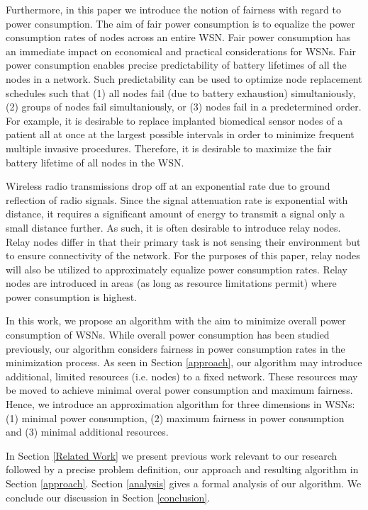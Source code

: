 Furthermore, in this paper we introduce the notion of fairness with regard to power consumption. The aim of fair power consumption is to equalize the power consumption rates of nodes across an entire WSN. Fair power consumption has an immediate impact on economical and practical considerations for WSNs. Fair power consumption enables precise predictability of battery lifetimes of all the nodes in a network. Such predictability can be used to optimize node replacement schedules such that (1) all nodes fail (due to battery exhaustion) simultaniously, (2) groups of nodes fail simultaniously, or (3) nodes fail in a predetermined order. For example, it is desirable to replace implanted biomedical sensor nodes of a patient all at once at the largest possible intervals in order to minimize frequent multiple invasive procedures. Therefore, it is desirable to maximize the fair battery lifetime of all nodes in the WSN.

Wireless radio transmissions drop off at an exponential rate due to ground reflection of radio signals. Since the signal attenuation rate is exponential with distance, it requires a significant amount of energy to transmit a signal only a small distance further. As such, it is often desirable to introduce relay nodes. Relay nodes differ in that their primary task is not sensing their environment but to ensure connectivity of the network. For the purposes of this paper, relay nodes will also be utilized to approximately equalize power consumption rates. Relay nodes are introduced in areas (as long as resource limitations permit) where power consumption is highest.

In this work, we propose an algorithm with the aim to minimize overall power consumption of WSNs. While overall power consumption has been studied previously, our algorithm considers fairness in power consumption rates in the minimization process. As seen in Section \ref{approach}, our algorithm may introduce additional, limited resources (i.e. nodes) to a fixed network. These resources may be moved to achieve minimal overal power consumption and maximum fairness. Hence, we introduce an approximation algorithm for three dimensions in WSNs: (1) minimal power consumption, (2) maximum fairness in power consumption and (3) minimal additional resources.

In Section \ref{Related Work} we present previous work relevant to our research followed by a precise problem definition, our approach and resulting algorithm in Section \ref{approach}. Section \ref{analysis} gives a formal analysis of our algorithm. We conclude our discussion in Section \ref{conclusion}.

